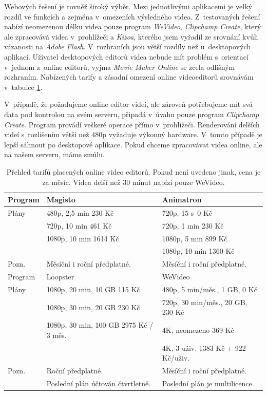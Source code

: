 Webových řešení je rovněž široký výběr. Mezi jednotlivými aplikacemi je velký rozdíl ve funkcích a zejména v~omezeních výsledného videa. Z~testovaných řešení nabízí neomezenou délku videa pouze program \textit{WeVideo}, \textit{Clipchamp Create}, který ale zpracovává videa v~prohlížeči a \textit{Kizoa}, kterého jsem vyřadil ze srovnání kvůli vázanosti na \textit{Adobe Flash}. V~rozhraních jsou větší rozdíly než u~desktopových aplikací. Uživatel desktopových editorů videa nebude mít problém s~orientací v~jednom z~online editorů, vyjma \textit{Movie Maker Online} se zcela odlišným rozhraním. Nabízených tarify a zásadní omezení online videoeditorů srovnávám v~tabulce \ref{tab:prices}.

V~případě, že požadujeme online editor videí, ale zároveň potřebujeme mít svá data pod kontrolou na svém serveru, připadá v~úvahu pouze program \textit{Clipchamp Create}. Program provádí veškeré operace přímo v~prohlížeči. Renderování delších videí s~rozlišením větší než 480p vyžaduje výkonný hardware. V~tomto případě je lepší sáhnout po desktopové aplikace. Pokud chceme zpracovávat videa online, ale na našem serveru, máme smůlu.

\begin{table}[h]
    \centering
    \begin{tabular}{|l|l|l|}
    \hline
    Program   & Magisto & Animatron\\
    \hline
    Plány   & 480p, 2,5 min 230 Kč & 720p, 15 s~0 Kč\\
            & 720p, 10 min 461 Kč   & 720p, 1 min 230 Kč\\
            & 1080p, 10 min 1614 Kč & 1080p, 5 min 899 Kč\\
            &                       & 1080p, 10 min 1360 Kč\\
    \hline
    Pozn.   & Měsíční i roční předplatné. & Měsíční i roční předplatné.\\
    \hline
    \hline
    Program & Loopster                                  & WeVideo\\
    \hline
    Plány   & 1080p, 20 min, 10 GB 115 Kč               & 480p, 5 min/měs., 1 GB, 0 Kč\\
            & 1080p, 30 min, 20 GB 230 Kč               & 720p, 30 min/měs., 20 GB, 230 Kč\\
            & 1080p, 30 min, 100 GB 2975 Kč / 3 měs.    & 4K, neomezeno 369 Kč\\
            &                                           & 4K, 3 uživ. 1383 Kč + 922 Kč/uživ.\\
    \hline
    Pozn.   & Roční předplatné.                         & Měsíční i roční předplatné.\\
            & Poslední plán účtován čtvrtletně.         & Poslední plán je multilicence.\\
    \hline
    \end{tabular}
    \caption{Přehled tarifů placených online video editorů. Pokud není uvedeno jinak, cena je za měsíc. Videa delší než 30 minut nabízí pouze WeVideo.}
    \label{tab:prices}
\end{table}

